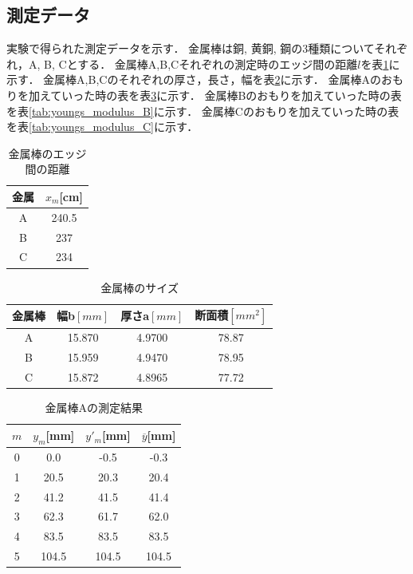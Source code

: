 \documentclass[a4paper,11pt]{ltjsarticle}
\begin{document}
\subsection{測定データ}
実験で得られた測定データを示す．
金属棒は銅, 黄銅, 鋼の3種類についてそれぞれ，A, B, Cとする．
金属棒A,B,Cそれぞれの測定時のエッジ間の距離$l$を表\ref{tab:metal_length}に示す．
金属棒A,B,Cのそれぞれの厚さ，長さ，幅を表\ref{tab:metal_size}に示す．
金属棒Aのおもりを加えていった時の表を表\ref{tab:youngs_modulus_A}に示す．
金属棒Bのおもりを加えていった時の表を表\ref{tab:youngs_modulus_B}に示す．
金属棒Cのおもりを加えていった時の表を表\ref{tab:youngs_modulus_C}に示す．
\begin{table}[htbp]
  \centering
  \caption{金属棒のエッジ間の距離}
  \label{tab:metal_length}
  \begin{tabular}{|c|c|}
    \hline
    金属 & $x_m$[cm] \\ \hline
    A  & 240.5     \\ \hline
    B  & 237       \\ \hline
    C  & 234       \\ \hline
  \end{tabular}
\end{table}
\begin{table}[htbp]
  \centering
  \caption{金属棒のサイズ}
  \label{tab:metal_size}
  \begin{tabular}{|c|c|c|c|}
    \hline
    金属棒 & 幅b$[mm]$ & 厚さa$[mm]$ & 断面積$[mm^2]$ \\ \hline
    A   & 15.870   & 4.9700    & 78.87       \\ \hline
    B   & 15.959   & 4.9470    & 78.95       \\ \hline
    C   & 15.872   & 4.8965    & 77.72       \\ \hline
  \end{tabular}
\end{table}
\begin{table}[htbp]
  \centering
  \caption{金属棒Aの測定結果}
  \label{tab:youngs_modulus_A}
  \begin{tabular}{|c|c|c|c|}
    \hline
    $m$ & $y_m$[mm] & $y'_m$[mm] & $\overline{y}$[mm] \\
    \hline
    0   & 0.0       & -0.5       & -0.3               \\
    \hline
    1   & 20.5      & 20.3       & 20.4               \\
    \hline
    2   & 41.2      & 41.5       & 41.4               \\
    \hline
    3   & 62.3      & 61.7       & 62.0               \\
    \hline
    4   & 83.5      & 83.5       & 83.5               \\
    \hline
    5   & 104.5     & 104.5      & 104.5              \\
    \hline
  \end{tabular}
\end{table}
\end{document}
